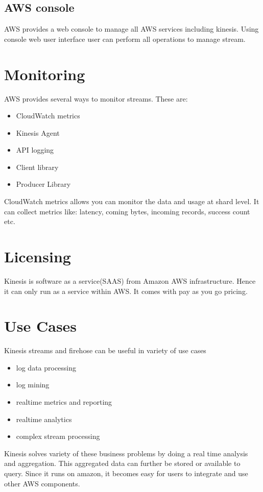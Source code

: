 \documentclass[9pt,twocolumn,twoside]{../../styles/osajnl}
\begin{document}
\subsection{AWS console}
AWS provides a web console to manage all AWS services including kinesis.  Using
console web user interface user can perform all operations to manage stream.

\section{Monitoring}
AWS provides several ways to monitor streams. These are:
\begin{itemize}
	\item CloudWatch metrics
	\item Kinesis Agent
	\item API logging
	\item Client library
	\item Producer Library
\end{itemize}
CloudWatch metrics allows you can monitor the data and usage at shard level. \GE
 It
can collect metrics like: latency, coming bytes, incoming records, success count
etc.

\section{Licensing}
Kinesis is software as a service(SAAS) from Amazon AWS infrastructure. Hence it
can only run as a service within AWS. It comes with pay as you go pricing.
\TE
{}

\section{Use Cases}
Kinesis streams \cite{www-kinesis} and firehose can be useful in variety of use
cases
\begin{itemize}
	\item log data processing
	\item log mining
	\item realtime metrics and reporting
	\item realtime analytics
	\item complex stream processing
\end{itemize}
Kinesis solves variety of these business problems by doing a real time analysis
and aggregation. This aggregated data can further be stored or available to
query. Since it runs on amazon, it becomes easy for users to integrate and use
other AWS components.
\end{document}
